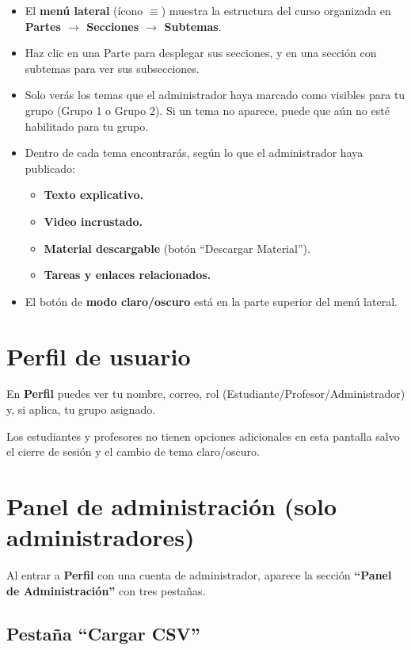 \documentclass[11pt,a4paper]{article}
\begin{document}
\begin{itemize}
  \item El \textbf{menú lateral} (ícono $\equiv$) muestra la estructura del curso organizada en \textbf{Partes $\rightarrow$ Secciones $\rightarrow$ Subtemas}.
  \item Haz clic en una Parte para desplegar sus secciones, y en una sección con subtemas para ver sus subsecciones.
  \item Solo verás los temas que el administrador haya marcado como visibles para tu grupo (Grupo 1 o Grupo 2). Si un tema no aparece, puede que aún no esté habilitado para tu grupo.
  \item Dentro de cada tema encontrarás, según lo que el administrador haya publicado:
  \begin{itemize}
    \item \textbf{Texto explicativo.}
    \item \textbf{Video incrustado.}
    \item \textbf{Material descargable} (botón ``Descargar Material'').
    \item \textbf{Tareas y enlaces relacionados.}
  \end{itemize}
  \item El botón de \textbf{modo claro/oscuro} está en la parte superior del menú lateral.
\end{itemize}

\section{Perfil de usuario}

En \textbf{Perfil} puedes ver tu nombre, correo, rol (Estudiante/Profesor/Administrador) y, si aplica, tu grupo asignado.

Los estudiantes y profesores no tienen opciones adicionales en esta pantalla salvo el cierre de sesión y el cambio de tema claro/oscuro.

\section{Panel de administración (solo administradores)}

Al entrar a \textbf{Perfil} con una cuenta de administrador, aparece la sección \textbf{``Panel de Administración''} con tres pestañas.

\subsection{Pestaña ``Cargar CSV''}
\end{document}
